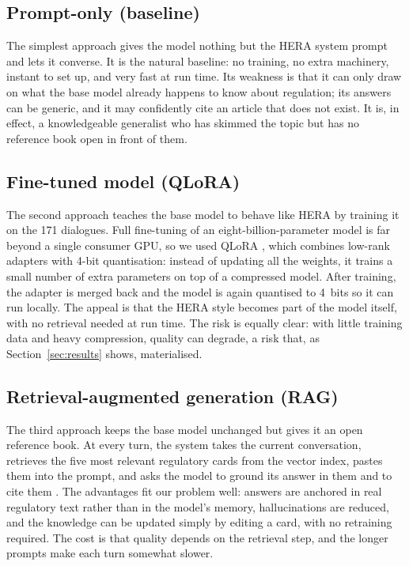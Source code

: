 \documentclass[11pt]{article}
\begin{document}
\subsection{Prompt-only (baseline)}
The simplest approach gives the model nothing but the HERA system prompt and lets it
converse. It is the natural baseline: no training, no extra machinery, instant to set up,
and very fast at run time. Its weakness is that it can only draw on what the base model
already happens to know about regulation; its answers can be generic, and it may
confidently cite an article that does not exist. It is, in effect, a knowledgeable
generalist who has skimmed the topic but has no reference book open in front of them.
\subsection{Fine-tuned model (QLoRA)}
The second approach teaches the base model to behave like HERA by training it on
the 171 dialogues. Full fine-tuning of an eight-billion-parameter model is far beyond a
single consumer GPU, so we used QLoRA \citep{dettmers2023qlora}, which combines low-rank
adapters \citep{hu2022lora} with 4-bit quantisation: instead of updating all the weights,
it trains a small number of extra parameters on top of a compressed model. After
training, the adapter is merged back and the model is again quantised to 4~bits so it can
run locally. The appeal is that the HERA style becomes part of the model itself, with no
retrieval needed at run time. The risk is equally clear: with little training data and
heavy compression, quality can degrade, a risk that, as Section~\ref{sec:results}
shows, materialised.
\subsection{Retrieval-augmented generation (RAG)}
The third approach keeps the base model unchanged but gives it an open reference book.
At every turn, the system takes the current conversation, retrieves the five most
relevant regulatory cards from the vector index, pastes them into the prompt, and asks
the model to ground its answer in them and to cite them \citep{lewis2020rag,
gao2023retrieval}. The advantages fit our problem well: answers are anchored in real
regulatory text rather than in the model's memory, hallucinations are reduced, and the
knowledge can be updated simply by editing a card, with no retraining required. The cost is
that quality depends on the retrieval step, and the longer prompts make each turn somewhat
slower.
\end{document}
